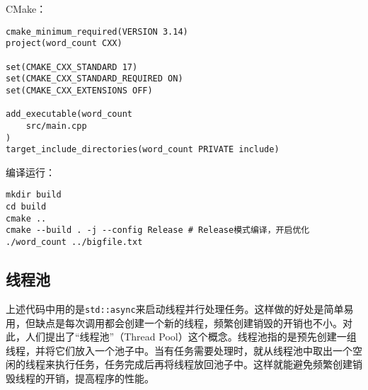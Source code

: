 CMake：
\begin{lstlisting}
cmake_minimum_required(VERSION 3.14)
project(word_count CXX)

set(CMAKE_CXX_STANDARD 17)
set(CMAKE_CXX_STANDARD_REQUIRED ON)
set(CMAKE_CXX_EXTENSIONS OFF)

add_executable(word_count
    src/main.cpp
)
target_include_directories(word_count PRIVATE include)
\end{lstlisting}

编译运行：
\begin{lstlisting}
mkdir build
cd build
cmake ..
cmake --build . -j --config Release # Release模式编译，开启优化
./word_count ../bigfile.txt
\end{lstlisting}

\subsection{线程池}

上述代码中用的是\texttt{std::async}来启动线程并行处理任务。这样做的好处是简单易用，但缺点是每次调用都会创建一个新的线程，频繁创建销毁的开销也不小。对此，人们提出了“线程池”（Thread Pool）这个概念。线程池指的是预先创建一组线程，并将它们放入一个池子中。当有任务需要处理时，就从线程池中取出一个空闲的线程来执行任务，任务完成后再将线程放回池子中。这样就能避免频繁创建销毁线程的开销，提高程序的性能。

